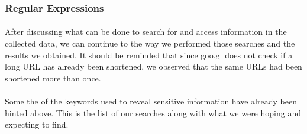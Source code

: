 \documentclass[12pt]{article}
\begin{document}
\subsubsection{Regular Expressions}

\paragraph{}
After discussing what can be done to search for and access information in the collected data, we can continue to the way we performed those searches and the results we obtained. It should be reminded that since goo.gl does not check if a long URL has already been shortened, we observed that the same URLs had been shortened more than once.

\paragraph{}
Some the of the keywords used to reveal sensitive information have already been hinted above. This is the list of our searches along with what we were hoping and expecting to find.
\end{document}
